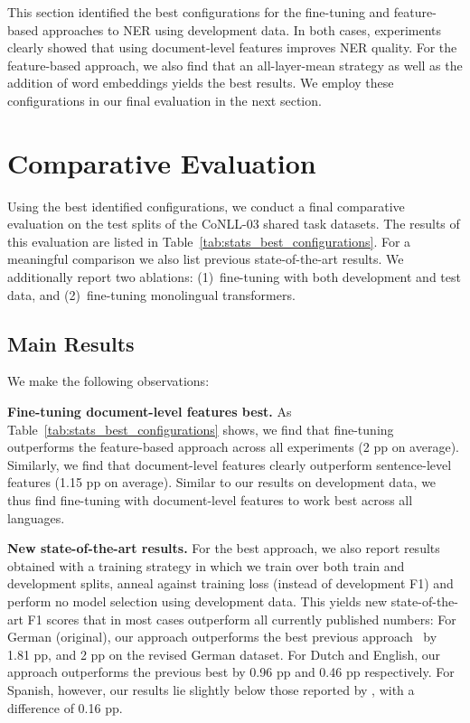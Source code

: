 \documentclass[11pt,a4paper]{article}
\begin{document}
This section identified the best configurations for the fine-tuning and feature-based approaches to NER using development data. In both cases, experiments clearly showed that using document-level features improves NER quality. For the feature-based approach, we also find that an all-layer-mean strategy as well as the addition of word embeddings yields the best results. We employ these configurations in our final evaluation in the next section.

\section{Comparative Evaluation}
\label{sec:evaluation}

Using the best identified configurations,  
we conduct a final comparative evaluation on the test splits of the CoNLL-03 shared task datasets. The results of this evaluation are listed in Table~\ref{tab:stats_best_configurations}. For a meaningful comparison we also list previous state-of-the-art results. We additionally report two ablations: (1)~fine-tuning with both development and test data, and (2)~fine-tuning monolingual transformers. 





\subsection{Main Results}



We make the following observations:

\noindent
\textbf{Fine-tuning document-level features best.} As Table~\ref{tab:stats_best_configurations} shows, we find that fine-tuning outperforms the feature-based approach across all experiments (2 pp on average). 
Similarly, we find that document-level features clearly outperform sentence-level features (1.15 pp on average). Similar to our results on development data, we thus find fine-tuning with document-level features to work best across all languages. 

\noindent 
\textbf{New state-of-the-art results.} For the best approach, we also report results obtained with a training strategy in which we train over both train and development splits,  anneal against training loss (instead of development F1) and perform no model selection using development data. This yields new state-of-the-art F1 scores that in most cases outperform all currently published numbers: For German (original), our approach outperforms the best previous approach~\cite{yu-etal-2020-named} by 1.81 pp, and 2 pp on the revised German dataset. For Dutch and English, our approach outperforms the previous best by 0.96 pp and 0.46 pp respectively. For Spanish, however, our results lie slightly below those reported by \citep{yu-etal-2020-named}, with a difference of 0.16 pp.  
\end{document}
